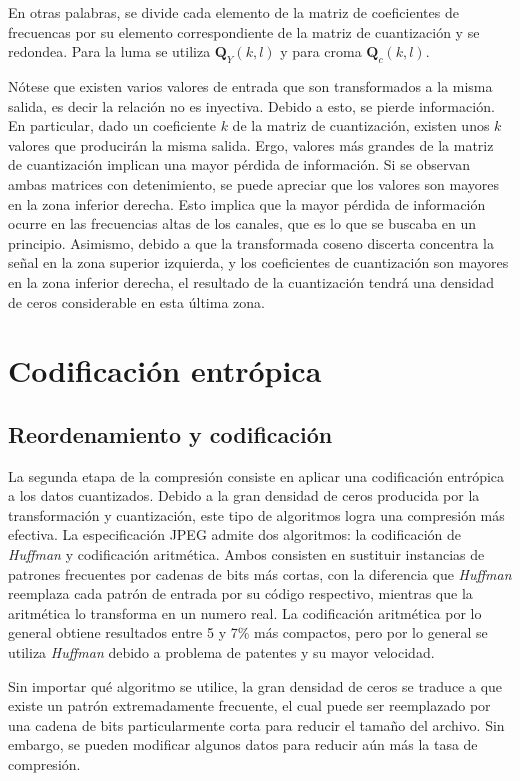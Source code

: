 \documentclass[%
	final,
	reprint,
	notitlepage,
	narroweqnarray,
	inline,
	twoside,
	invited
	]{ieee}
\begin{document}
\par En otras palabras, se divide cada elemento de la matriz de coeficientes de frecuencas por su elemento 
correspondiente de la matriz de cuantización y se redondea. Para la luma se utiliza $\mathbf{Q}_Y(k,l)$ y para 
croma $\mathbf{Q}_c(k,l)$.
\par Nótese que existen varios valores de entrada que son transformados a la misma salida, es decir la relación 
no es inyectiva. Debido a esto, se pierde información. En particular, dado un coeficiente $k$ de la matriz 
de cuantización, existen unos $k$ valores que producirán la misma salida. Ergo, 
valores más grandes de la matriz de cuantización implican una mayor pérdida de información. Si se observan ambas 
matrices con detenimiento, se puede apreciar que los valores son mayores en la zona inferior derecha. Esto 
implica que la mayor pérdida de información ocurre en las frecuencias altas de los canales, que es lo que se 
buscaba en un principio.  Asimismo, debido a que la transformada coseno discerta concentra la señal en la zona 
superior izquierda, y los coeficientes de cuantización son mayores en la zona inferior derecha, el resultado de la 
cuantización tendrá una densidad de ceros considerable en esta última zona.

\section{Codificación entrópica}

\subsection{Reordenamiento y codificación}

\par La segunda etapa de la compresión consiste en aplicar una codificación entrópica a los datos cuantizados. Debido 
a la gran densidad de ceros producida por la transformación y cuantización, este tipo de algoritmos logra 
una compresión más efectiva. La especificación JPEG admite dos algoritmos: la codificación de \textit{Huffman} y 
codificación aritmética. Ambos consisten en sustituir instancias de patrones frecuentes por cadenas de bits 
más cortas, con la diferencia que \textit{Huffman} reemplaza cada patrón de entrada por su código respectivo, 
mientras que la aritmética lo transforma en un numero real. La codificación aritmética por lo general obtiene 
resultados entre 5 y 7\% más compactos, pero por lo general se utiliza \textit{Huffman} debido a problema de patentes 
y su mayor velocidad.
\par Sin importar qué algoritmo se utilice, la gran densidad de ceros se traduce a que existe un patrón extremadamente 
frecuente, el cual puede ser reemplazado por una cadena de bits particularmente corta para reducir el tamaño del 
archivo. Sin embargo, se pueden modificar algunos datos para reducir aún más la tasa de compresión.
\end{document}
